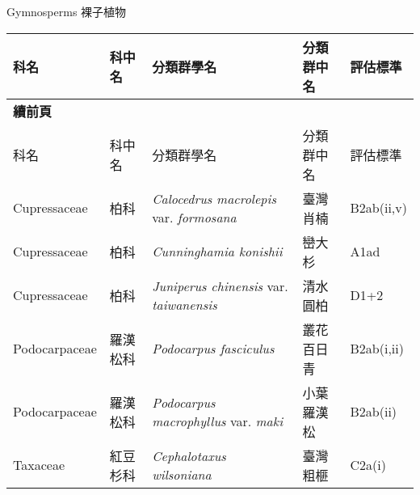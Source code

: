 \noindent\normalfont\selectfont Gymnosperms 裸子植物
\footnotesize\selectfont
        {\def\arraystretch{1.5}\tabcolsep=2pt
        \begin{longtable}{p{2.5cm}p{2.5cm}p{4.5cm}p{2.5cm}p{3cm}}
        \toprule
          科名 & 科中名 & 分類群學名 & 分類群中名 & 評估標準 \\
        \midrule 
        \endfirsthead

        {{\bfseries 續前頁 }} \\
        科名 & 科中名 & 分類群學名 & 分類群中名 & 評估標準 \\
        \midrule
        \endhead
                Cupressaceae & 柏科 & \textit{Calocedrus macrolepis} var. \textit{formosana}  & 臺灣肖楠 & B2ab(ii,v) \index{Calocedrus@\textit{Calocedrus}!macrolepis@\textit{macrolepis}!var. formosana@var. \textit{formosana}}  \index{臺灣肖楠} \\
    Cupressaceae & 柏科 & \textit{Cunninghamia konishii}  & 巒大杉 & A1ad \index{Cunninghamia@\textit{Cunninghamia}!konishii@\textit{konishii}}  \index{巒大杉} \\
    Cupressaceae & 柏科 & \textit{Juniperus chinensis} var. \textit{taiwanensis}  & 清水圓柏 & D1+2 \index{Juniperus@\textit{Juniperus}!chinensis@\textit{chinensis}!var. taiwanensis@var. \textit{taiwanensis}}  \index{清水圓柏} \\
    Podocarpaceae & 羅漢松科 & \textit{Podocarpus fasciculus}  & 叢花百日青 & B2ab(i,ii) \index{Podocarpus@\textit{Podocarpus}!fasciculus@\textit{fasciculus}}  \index{叢花百日青} \\
    Podocarpaceae & 羅漢松科 & \textit{Podocarpus macrophyllus} var. \textit{maki}  & 小葉羅漢松 & B2ab(ii) \index{Podocarpus@\textit{Podocarpus}!macrophyllus@\textit{macrophyllus}!var. maki@var. \textit{maki}}  \index{小葉羅漢松} \\
    Taxaceae & 紅豆杉科 & \textit{Cephalotaxus wilsoniana}  & 臺灣粗榧 & C2a(i) \index{Cephalotaxus@\textit{Cephalotaxus}!wilsoniana@\textit{wilsoniana}}  \index{臺灣粗榧} \\
    \bottomrule
        \end{longtable}
        }
    